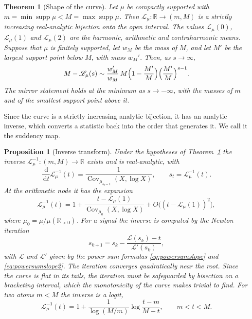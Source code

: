 \documentclass[sn-mathphys-num]{sn-jnl}\newcommand{\SNJNL}{}
\theoremstyle{thmstyleone}
\newtheorem{theorem}{Theorem}
\newtheorem{proposition}{Proposition}
\theoremstyle{thmstyletwo}
\theoremstyle{thmstylethree}
\theoremstyle{thmstyleone}
\providecommand{\R}{\mathbb{R}}
\providecommand{\Cov}{\operatorname{Cov}}
\providecommand{\Rpos}{\mathbb{R}_{>0}}
\providecommand{\Leh}{\mathscr{L}}
\providecommand{\dd}{\,\mathrm{d}}
\providecommand{\supp}{\operatorname{supp}}
\begin{document}
	\begin{theorem}[Shape of the curve]\label{thm:statgen}
		Let $\mu$ be compactly supported with
		$m=\min\supp\mu<M=\max\supp\mu$. Then $\Leh_\mu:\R\to(m,M)$ is a
		strictly increasing real-analytic bijection onto the open interval.
		The values $\Leh_\mu(0)$, $\Leh_\mu(1)$ and $\Leh_\mu(2)$ are the
		harmonic, arithmetic and contraharmonic means. Suppose that $\mu$ is finitely supported, let $w_M$ be the mass of
		$M$, and let $M'$ be the largest support point below $M$, with mass
		$w_M'$. Then, as $s\to\infty$,
		\begin{equation}\label{eq:georate}
			M-\Leh_\mu(s)\sim\frac{w_M'}{w_M}\,M\Bigl(1-\frac{M'}{M}\Bigr)\Bigl(\frac{M'}{M}\Bigr)^{s-1}.
		\end{equation}
		The mirror statement holds at the minimum as $s\to-\infty$, with
		the masses of $m$ and of the smallest support point above it.
	\end{theorem}
	
	Since the curve is a strictly increasing analytic bijection, it has
	an analytic inverse, which converts a statistic back into the order
	that generates it. We call it the suddency map.
	
	\begin{proposition}[Inverse transform]\label{prop:inverse}
		Under the hypotheses of Theorem~\ref{thm:statgen} the inverse
		$\Leh_\mu^{-1}:(m,M)\to\R$ exists and is real-analytic, with
		\begin{equation}\label{eq:inversederivative}
			\frac{\dd}{\dd t}\Leh_\mu^{-1}(t)
			=\frac{1}{\Cov_{\mu_{s_t-1}}(X,\log X)},
			\qquad s_t=\Leh_\mu^{-1}(t).
		\end{equation}
		At the arithmetic node it has the expansion
		\begin{equation}\label{eq:suddencymap}
			\Leh_\mu^{-1}(t)=1+\frac{t-\Leh_\mu(1)}{\Cov_{\mu_0}(X,\log X)}
			+O\bigl((t-\Leh_\mu(1))^{2}\bigr),
		\end{equation}
		where $\mu_0=\mu/\mu(\Rpos)$. For a signal the inverse is
		computed by the Newton iteration
		\begin{equation}\label{eq:newton}
			s_{k+1}=s_k-\frac{\Leh(s_k)-t}{\Leh'(s_k)},
		\end{equation}
		with $\Leh$ and $\Leh'$ given by the power-sum formulas
		\eqref{eq:powersumslope} and \eqref{eq:powersumslope2}. The iteration converges quadratically near the root. Since the
		curve is flat in its tails, the iteration must be safeguarded by
		bisection on a bracketing interval, which the monotonicity of the
		curve makes trivial to find. For two atoms $m<M$ the inverse is
		a logit,
		\begin{equation}\label{eq:twopointinverse}
			\Leh_\mu^{-1}(t)=1+\frac{1}{\log(M/m)}\log\frac{t-m}{M-t},
			\qquad m<t<M .
		\end{equation}
	\end{proposition}
	
\end{document}
